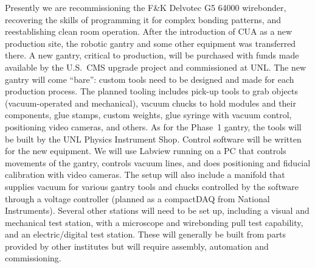 
Presently we are recommissioning the F\&K Delvotec G5 64000 wirebonder, recovering the skills of programming it for complex bonding patterns, and reestablishing clean room operation.  After the introduction of CUA as a new production site, the robotic gantry and some other equipment was transferred there.
A new gantry, critical to production, will be purchased with funds made available by the U.S.~CMS upgrade project and commissioned at UNL.  
The new gantry will come ``bare'': custom tools need to be designed and made for each production process. The planned tooling includes pick-up tools to grab objects (vacuum-operated and mechanical), vacuum chucks to hold modules and their components, glue stamps, custom weights, glue syringe with vacuum control, positioning video cameras, and others. As for the Phase~1 gantry, the tools will be built by the UNL Physics Instrument Shop. Control software will be written for the new equipment. We will use Labview running on a PC that controls movements of the gantry, controls vacuum lines, and does positioning and fiducial calibration with video cameras. The setup will also include a manifold that supplies vacuum for various gantry tools and chucks controlled by the software through a voltage controller (planned as a compactDAQ from National Instruments). Several other stations will need to be set up, including a visual and mechanical test station, with a microscope and wirebonding pull test capability, and an electric/digital test station.  These will generally be built from parts provided by other institutes but will require assembly, automation and commissioning.

